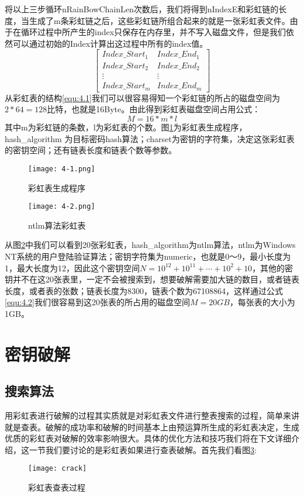 将以上三步循环nRainBowChainLen次数后，我们将得到nIndexE和彩虹链的长度，当生成了m条彩虹链之后，这些彩虹链所组合起来的就是一张彩虹表文件。由于在循环过程中所产生的index只保存在内存里，并不写入磁盘文件，但是我们依然可以通过初始的Index计算出这过程中所有的index值。
\begin{equation}
\label{equ:4.1}
\begin{bmatrix}
Index\_Start_1 & Index\_End_1 \\
Index\_Start_2 & Index\_End_2 \\
\vdots  & \vdots \\
Index\_Start_m & Index\_End_m 
\end{bmatrix}
\end{equation}
从彩虹表的结构\eqref{equ:4.1}我们可以很容易得知一个彩虹链的所占的磁盘空间为$2*64=128$比特，也就是16Byte。由此得到彩虹表磁盘空间占用公式：
\begin{equation}
\label{equ:4.2}
M=16*m*l
\end{equation}
其中m为彩虹链的条数，l为彩虹表的个数。图\ref{fig:4.1}为彩虹表生成程序，hash\_algorithm 为目标密码hash算法；charset为密钥的字符集，决定这张彩虹表的密钥空间；还有链表长度和链表个数等参数。
\begin{figure}[!ht]
\centering
\texttt{[image: 4-1.png]}
\caption{彩虹表生成程序}
\label{fig:4.1}
\end{figure}
\begin{figure}[!ht]
\centering
\texttt{[image: 4-2.png]}
\caption{ntlm算法彩虹表}
\label{fig:4.2}
\end{figure}
从图\ref{fig:4.2}中我们可以看到20张彩虹表，hash\_algorithm为ntlm算法，ntlm为Windows NT系统的用户登陆验证算法；密钥字符集为numeric，也就是0～9，最小长度为1，最大长度为12，因此这个密钥空间$N=10^{12}+10^{11}+ \cdots +10^2 +10$，其他的密钥并不在这20张表里，一定不会被搜索到，想要破解需要加大链的数目，或者链表长度，或者表的张数；链表长度为8300，链表个数为67108864，这样通过公式\eqref{equ:4.2}我们很容易到这20张表的所占用的磁盘空间$M=20GB$，每张表的大小为1GB。
\section{密钥破解}
\subsection{搜索算法}
用彩虹表进行破解的过程其实质就是对彩虹表文件进行整表搜索的过程，简单来讲就是查表。破解的成功率和破解的时间基本上由预运算所生成的彩虹表决定，生成优质的彩虹表对破解的效率影响很大。具体的优化方法和技巧我们将在下文详细介绍，这一节我们要讨论的是彩虹表如果进行查表破解。首先我们看图\ref{fig:4.3}:
\begin{figure}[!ht]
\centering
\texttt{[image: crack]}
\caption{彩虹表查表过程}
\label{fig:4.3}
\end{figure}

